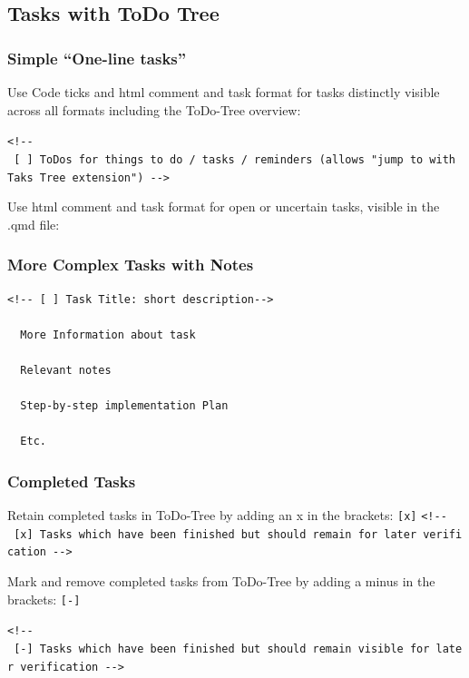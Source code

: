 \documentclass[
  11pt,
  letterpaper,
]{book}
\begin{document}
\subsection{Tasks with ToDo Tree}\label{tasks-with-todo-tree-1}

\subsubsection{Simple ``One-line tasks''}\label{simple-one-line-tasks-1}

Use Code ticks and html comment and task format for tasks distinctly
visible across all formats including the ToDo-Tree overview:

\texttt{\textless{}!-\/-\ {[}\ {]}\ ToDos\ for\ things\ to\ do\ /\ tasks\ /\ reminders\ (allows\ "jump\ to\ with\ Taks\ Tree\ extension")\ -\/-\textgreater{}}

Use html comment and task format for open or uncertain tasks, visible in
the .qmd file:

\subsubsection{More Complex Tasks with
Notes}\label{more-complex-tasks-with-notes-1}

\begin{verbatim}
<!-- [ ] Task Title: short description-->

  More Information about task

  Relevant notes

  Step-by-step implementation Plan

  Etc.
\end{verbatim}

\subsubsection{Completed Tasks}\label{completed-tasks-1}

Retain completed tasks in ToDo-Tree by adding an x in the brackets:
\texttt{{[}x{]}}
\texttt{\textless{}!-\/-\ {[}x{]}\ Tasks\ which\ have\ been\ finished\ but\ should\ remain\ for\ later\ verification\ -\/-\textgreater{}}

Mark and remove completed tasks from ToDo-Tree by adding a minus in the
brackets: \texttt{{[}-{]}}

\texttt{\textless{}!-\/-\ {[}-{]}\ Tasks\ which\ have\ been\ finished\ but\ should\ remain\ visible\ for\ later\ verification\ -\/-\textgreater{}}
\end{document}

